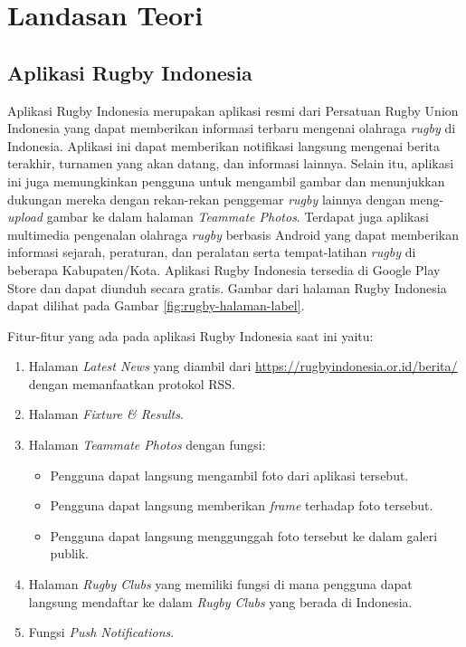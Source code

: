 
\chapter{Landasan Teori}
\label{chap:teori}

\section{Aplikasi Rugby Indonesia}
\label{sec:skripsi} 
    Aplikasi Rugby Indonesia merupakan aplikasi resmi dari Persatuan Rugby Union Indonesia yang dapat memberikan informasi terbaru mengenai olahraga \textit{rugby} di Indonesia. Aplikasi ini dapat memberikan notifikasi langsung mengenai berita terakhir, turnamen yang akan datang, dan informasi lainnya. Selain itu, aplikasi ini juga memungkinkan pengguna untuk mengambil gambar dan menunjukkan dukungan mereka dengan rekan-rekan penggemar \textit{rugby} lainnya dengan meng-\textit{upload} gambar ke dalam halaman \textit{Teammate Photos}. Terdapat juga aplikasi multimedia pengenalan olahraga \textit{rugby} berbasis Android yang dapat memberikan informasi sejarah, peraturan, dan peralatan serta tempat-latihan \textit{rugby} di beberapa Kabupaten/Kota. Aplikasi Rugby Indonesia tersedia di Google Play Store dan dapat diunduh secara gratis. Gambar dari halaman Rugby Indonesia dapat dilihat pada Gambar \ref{fig:rugby-halaman-label}.


    Fitur-fitur yang ada pada aplikasi Rugby Indonesia saat ini yaitu:

    \begin{enumerate}
        \item Halaman \textit{Latest News} yang diambil dari \url{https://rugbyindonesia.or.id/berita/} dengan memanfaatkan protokol RSS. 
        \item Halaman \textit{Fixture \& Results}.
        \item Halaman \textit{Teammate Photos} dengan fungsi:
        \begin{itemize}
            \item Pengguna dapat langsung mengambil foto dari aplikasi tersebut.
            \item Pengguna dapat langsung memberikan \textit{frame} terhadap foto tersebut.
            \item Pengguna dapat langsung menggunggah foto tersebut ke dalam galeri publik.
        \end{itemize}
    \item Halaman \textit{Rugby Clubs} yang memiliki fungsi di mana pengguna dapat langsung mendaftar ke dalam \textit{Rugby Clubs} yang berada di Indonesia.
    \item Fungsi \textit{Push Notifications}.
    \end{enumerate}
    
